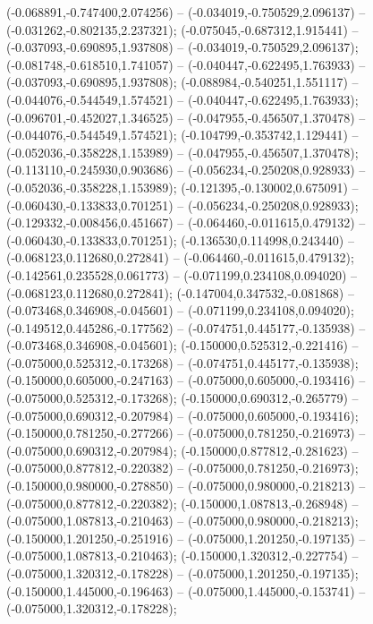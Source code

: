  (-0.068891,-0.747400,2.074256) -- (-0.034019,-0.750529,2.096137) -- (-0.031262,-0.802135,2.237321);
 (-0.075045,-0.687312,1.915441) -- (-0.037093,-0.690895,1.937808) -- (-0.034019,-0.750529,2.096137);
 (-0.081748,-0.618510,1.741057) -- (-0.040447,-0.622495,1.763933) -- (-0.037093,-0.690895,1.937808);
 (-0.088984,-0.540251,1.551117) -- (-0.044076,-0.544549,1.574521) -- (-0.040447,-0.622495,1.763933);
 (-0.096701,-0.452027,1.346525) -- (-0.047955,-0.456507,1.370478) -- (-0.044076,-0.544549,1.574521);
 (-0.104799,-0.353742,1.129441) -- (-0.052036,-0.358228,1.153989) -- (-0.047955,-0.456507,1.370478);
 (-0.113110,-0.245930,0.903686) -- (-0.056234,-0.250208,0.928933) -- (-0.052036,-0.358228,1.153989);
 (-0.121395,-0.130002,0.675091) -- (-0.060430,-0.133833,0.701251) -- (-0.056234,-0.250208,0.928933);
 (-0.129332,-0.008456,0.451667) -- (-0.064460,-0.011615,0.479132) -- (-0.060430,-0.133833,0.701251);
 (-0.136530,0.114998,0.243440) -- (-0.068123,0.112680,0.272841) -- (-0.064460,-0.011615,0.479132);
 (-0.142561,0.235528,0.061773) -- (-0.071199,0.234108,0.094020) -- (-0.068123,0.112680,0.272841);
 (-0.147004,0.347532,-0.081868) -- (-0.073468,0.346908,-0.045601) -- (-0.071199,0.234108,0.094020);
 (-0.149512,0.445286,-0.177562) -- (-0.074751,0.445177,-0.135938) -- (-0.073468,0.346908,-0.045601);
 (-0.150000,0.525312,-0.221416) -- (-0.075000,0.525312,-0.173268) -- (-0.074751,0.445177,-0.135938);
 (-0.150000,0.605000,-0.247163) -- (-0.075000,0.605000,-0.193416) -- (-0.075000,0.525312,-0.173268);
 (-0.150000,0.690312,-0.265779) -- (-0.075000,0.690312,-0.207984) -- (-0.075000,0.605000,-0.193416);
 (-0.150000,0.781250,-0.277266) -- (-0.075000,0.781250,-0.216973) -- (-0.075000,0.690312,-0.207984);
 (-0.150000,0.877812,-0.281623) -- (-0.075000,0.877812,-0.220382) -- (-0.075000,0.781250,-0.216973);
 (-0.150000,0.980000,-0.278850) -- (-0.075000,0.980000,-0.218213) -- (-0.075000,0.877812,-0.220382);
 (-0.150000,1.087813,-0.268948) -- (-0.075000,1.087813,-0.210463) -- (-0.075000,0.980000,-0.218213);
 (-0.150000,1.201250,-0.251916) -- (-0.075000,1.201250,-0.197135) -- (-0.075000,1.087813,-0.210463);
 (-0.150000,1.320312,-0.227754) -- (-0.075000,1.320312,-0.178228) -- (-0.075000,1.201250,-0.197135);
 (-0.150000,1.445000,-0.196463) -- (-0.075000,1.445000,-0.153741) -- (-0.075000,1.320312,-0.178228);
